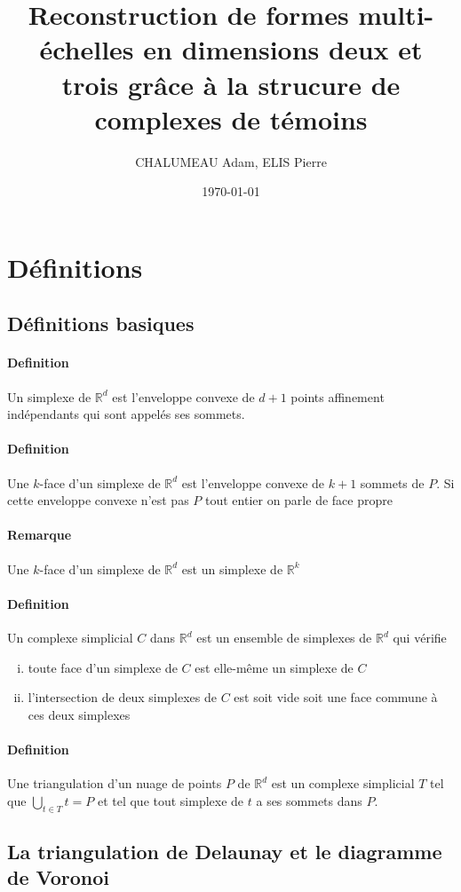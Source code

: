 ﻿\documentclass{article}
\title{\textbf{Reconstruction de formes multi-échelles en dimensions deux et trois grâce à la strucure de complexes de témoins}}
\author{CHALUMEAU Adam,	ELIS Pierre}
\date{\today}
\begin{document}
\maketitle

\section{Définitions}
\subsection{Définitions basiques}
\paragraph{Definition} Un simplexe de $\mathbb{R}^d$ est l'enveloppe convexe de $d+1$ points affinement indépendants qui sont appelés ses sommets.
\paragraph{Definition} Une $k$-face d'un simplexe de $\mathbb{R}^d$ est l'enveloppe convexe de $k+1$ sommets de $P$. Si cette enveloppe convexe n'est pas $P$ tout entier on parle de face propre
\paragraph{Remarque} Une $k$-face d'un simplexe de $\mathbb{R}^d$ est un simplexe de $\mathbb{R}^k$
\paragraph{Definition} Un complexe simplicial $C$ dans $\mathbb{R}^d$ est un ensemble de simplexes de $\mathbb{R}^d$ qui vérifie
\begin{enumerate}[(i)]
	\item toute face d'un simplexe de $C$ est elle-même un simplexe de $C$
	\item l'intersection de deux simplexes de $C$ est soit vide soit une face commune à ces deux simplexes
\end{enumerate}
\paragraph{Definition} Une triangulation d'un nuage de points $P$ de $\mathbb{R}^d$ est un complexe simplicial $T$ tel que $\bigcup\limits_{t\in T}t = P$ et tel que tout simplexe de $t$ a ses sommets dans $P$.
\subsection{La triangulation de Delaunay et le diagramme de Voronoi}
\end{document}
